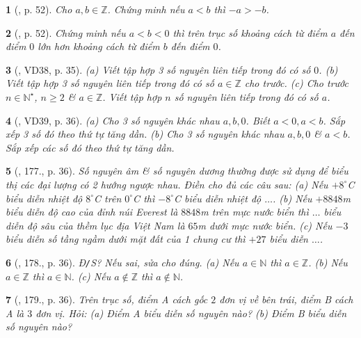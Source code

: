 \documentclass{article}
\newtheorem{baitoan}{}
\begin{document}
\begin{baitoan}[\cite{Binh_boi_duong_Toan_6_tap_1}, p. 52]
	Cho $a,b\in\mathbb{Z}$. Chứng minh nếu $a < b$ thì $-a > -b$.	
\end{baitoan}

\begin{baitoan}[\cite{Binh_boi_duong_Toan_6_tap_1}, p. 52]
	Chứng minh nếu $a < b < 0$ thì trên trục số khoảng cách từ điểm $a$ đến điểm $0$ lớn hơn khoảng cách từ điểm $b$ đến điểm $0$.	
\end{baitoan}

\begin{baitoan}[\cite{Tuyen_Toan_6}, VD38, p. 35]
	(a) Viết tập hợp 3 số nguyên liên tiếp trong đó có số $0$. (b) Viết tập hợp 3 số nguyên liên tiếp trong đó có số $a\in\mathbb{Z}$ cho trước. (c) Cho trước $n\in\mathbb{N}^\star$, $n\ge2$ \& $a\in\mathbb{Z}$. Viết tập hợp $n$ số nguyên liên tiếp trong đó có số $a$.
\end{baitoan}

\begin{baitoan}[\cite{Tuyen_Toan_6}, VD39, p. 36]
	(a) Cho 3 số nguyên khác nhau $a,b,0$. Biết $a < 0,a < b$. Sắp xếp 3 số đó theo thứ tự tăng dần. (b) Cho 3 số nguyên khác nhau $a,b,0$ \& $a < b$. Sắp xếp các số đó theo thứ tự tăng dần.
\end{baitoan}

\begin{baitoan}[\cite{Tuyen_Toan_6}, 177., p. 36]
	Số nguyên âm \& số nguyên dương thường được sử dụng để biểu thị các đại lượng có 2 hướng ngược nhau. Điền cho đủ các câu sau: (a) Nếu $+8^\circ$C biểu diễn nhiệt độ $8^\circ$C trên $0^\circ$C thì $-8^\circ$C biểu diễn nhiệt độ $\ldots$. (b) Nếu $+8848$\emph{m} biểu diễn độ cao của đỉnh núi Everest là $8848$\emph{m} trên mực nước biển thì $\ldots$ biểu diễn độ sâu của thềm lục địa Việt Nam là $65$\emph{m} dưới mực nước biển. (c) Nếu $-3$ biểu diễn số tầng ngầm dưới mặt đất của 1 chung cư thì $+27$ biểu diễn $\ldots$.
\end{baitoan}

\begin{baitoan}[\cite{Tuyen_Toan_6}, 178., p. 36]
	{\rm Đ{\tt/}S?} Nếu sai, sửa cho đúng. (a) Nếu $a\in\mathbb{N}$ thì $a\in\mathbb{Z}$. (b) Nếu $a\in\mathbb{Z}$ thì $a\in\mathbb{N}$. (c) Nếu $a\notin\mathbb{Z}$ thì $a\notin\mathbb{N}$.
\end{baitoan}

\begin{baitoan}[\cite{Tuyen_Toan_6}, 179., p. 36]
	Trên trục số, điểm A cách gốc $2$ đơn vị về bên trái, điểm B cách A là $3$ đơn vị. Hỏi: (a) Điểm A biểu diễn số nguyên nào? (b) Điểm B biểu diễn số nguyên nào?
\end{baitoan}
\end{document}

